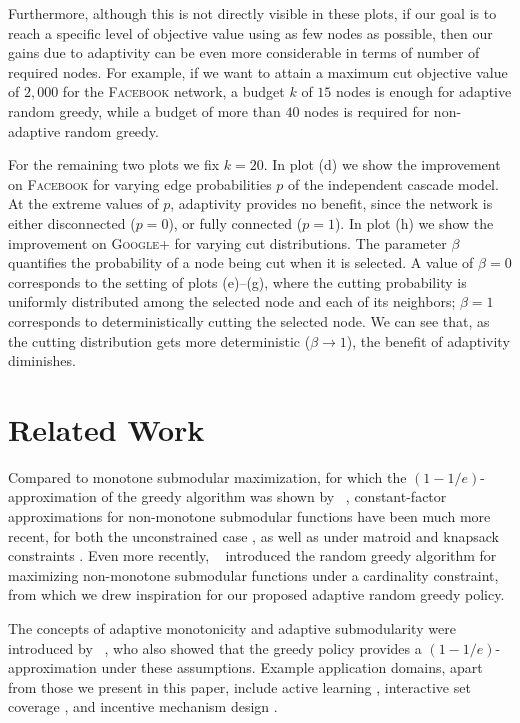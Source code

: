 \documentclass{article}
\newcommand{\citet}[1]{\citeauthor{#1}~\shortcite{#1}}
\newcommand{\fbook}{\textsc{Facebook}\xspace}
\newcommand{\gplus}{\textsc{Google+}\xspace}
\begin{document}
Furthermore, although this is not directly visible in these plots, if our goal is to reach a specific level of objective value using as few nodes as possible, then our gains due to adaptivity can be even more considerable in terms of number of required nodes.
For example, if we want to attain a maximum cut objective value of $2,000$ for the \fbook network, a budget $k$ of $15$ nodes is enough for adaptive random greedy, while a budget of more than $40$ nodes is required for non-adaptive random greedy.

For the remaining two plots we fix $k=20$.
In plot (d) we show the improvement on \fbook for varying edge probabilities $p$ of the independent cascade model.
At the extreme values of $p$, adaptivity provides no benefit, since the network is either disconnected ($p=0$), or fully connected ($p=1$).
In plot (h) we show the improvement on \gplus for varying cut distributions.
The parameter $\beta$ quantifies the probability of a node being cut when it is selected.
A value of $\beta=0$ corresponds to the setting of plots (e)--(g), where the cutting probability is uniformly distributed among the selected node and each of its neighbors; $\beta=1$ corresponds to deterministically cutting the selected node.
We can see that, as the cutting distribution gets more deterministic ($\beta \to 1$), the benefit of adaptivity diminishes.

\section{Related Work}
Compared to monotone submodular maximization, for which the $(1-1/e)$-approximation of the greedy algorithm was shown by \citet{nemhauser78}, constant-factor approximations for non-monotone submodular functions have been much more recent, for both the unconstrained case \cite{feige07}, as well as under matroid and knapsack constraints \cite{lee09}.
Even more recently, \citet{buchbinder14} introduced the random greedy algorithm for maximizing non-monotone submodular functions under a cardinality constraint, from which we drew inspiration for our proposed adaptive random greedy policy.

The concepts of adaptive monotonicity and adaptive submodularity were introduced by \citet{golovin11}, who also showed that the greedy policy provides a $(1-1/e)$-approximation under these assumptions.
Example application domains, apart from those we present in this paper, include active learning \cite{chen14}, interactive set coverage \cite{guillory10}, and incentive mechanism design \cite{singla13}.
\end{document}
